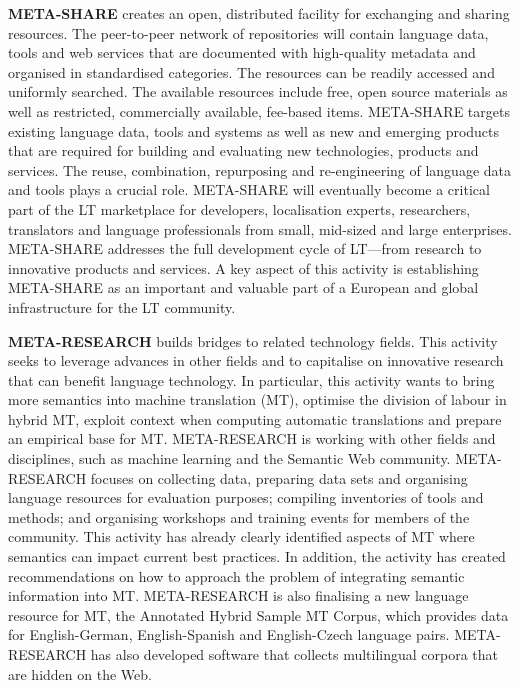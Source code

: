\begin{multicols}{2}
\begin{itemize}
\begin{multicols}{2}
\textbf{META-SHARE} creates an open, distributed facility for exchanging and sharing resources. The peer-to-peer network of repositories will contain language data, tools and web services that are documented with high-quality metadata and organised in standardised categories. The resources can be readily accessed and uniformly searched. The available resources include free, open source materials as well as restricted, commercially available, fee-based items. META-SHARE targets existing language data, tools and systems as well as new and emerging products that are required for building and evaluating new technologies, products and services. The reuse, combination, repurposing and re-engineering of language data and tools plays a crucial role. META-SHARE will eventually become a critical part of the LT marketplace for developers, localisation experts, researchers, translators and language professionals from small, mid-sized and large enterprises. META-SHARE addresses the full development cycle of LT—from research to innovative products and services. A key aspect of this activity is establishing META-SHARE as an important and valuable part of a European and global infrastructure for the LT community. 

\textbf{META-RESEARCH} builds bridges to related technology fields. This activity seeks to leverage advances in other fields and to capitalise on innovative research that can benefit language technology. In particular, this activity wants to bring more semantics into machine translation (MT), optimise the division of labour in hybrid MT, exploit context when computing automatic translations and prepare an empirical base for MT. META-RESEARCH is working with other fields and disciplines, such as machine learning and the Semantic Web community. META-RESEARCH focuses on collecting data, preparing data sets and organising language resources for evaluation purposes; compiling inventories of tools and methods; and organising workshops and training events for members of the community. This activity has already clearly identified aspects of MT where semantics can impact current best practices. In addition, the activity has created recommendations on how to approach the problem of integrating semantic information into MT. META-RESEARCH is also finalising a new language resource for MT, the Annotated Hybrid Sample MT Corpus, which provides data for English-German, English-Spanish and English-Czech language pairs. META-RESEARCH has also developed software that collects multilingual corpora that are hidden on the Web.
\end{multicols}


\end{itemize}
\end{multicols}
